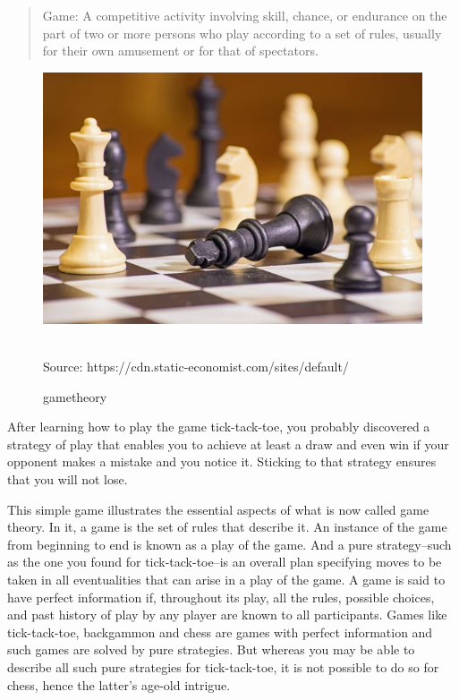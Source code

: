 \begin{quote}
    Game: A competitive activity involving skill, chance, or endurance on the part of two or more persons who play according to a set of rules, usually for their own amusement or for that of spectators.\\
\end{quote}
\begin{figure}
    \centering
    \includegraphics[]{game.jpg}
    \caption{gametheory}\\
    Source: https://cdn.static-economist.com/sites/default/
    \label{game:1}
\end{figure}
After learning how to play the game tick-tack-toe, you probably discovered a strategy of play that enables you to achieve at least a draw and even win if your opponent makes a mistake and you notice it. Sticking to that strategy ensures that you will not lose.

This simple game illustrates the essential aspects of what is now called game theory. In it, a game is the set of rules that describe it. An instance of the game from beginning to end is known as a play of the game. And a pure strategy--such as the one you found for tick-tack-toe--is an overall plan specifying moves to be taken in all eventualities that can arise in a play of the game. A game is said to have perfect information if, throughout its play, all the rules, possible choices, and past history of play by any player are known to all participants. Games like tick-tack-toe, backgammon and chess are games with perfect information and such games are solved by pure strategies. But whereas you may be able to describe all such pure strategies for tick-tack-toe, it is not possible to do so for chess, hence the latter's age-old intrigue.


